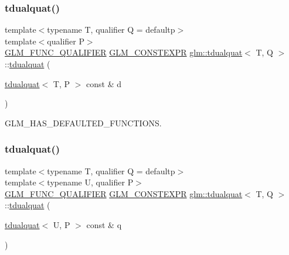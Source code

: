 \subsubsection{\texorpdfstring{tdualquat()}{tdualquat()}\hspace{0.1cm}{\footnotesize\ttfamily [10/11]}}
{\footnotesize\ttfamily template$<$typename T, qualifier Q = defaultp$>$ \\
template$<$qualifier P$>$ \\
\hyperlink{setup_8hpp_a33fdea6f91c5f834105f7415e2a64407}{G\+L\+M\+\_\+\+F\+U\+N\+C\+\_\+\+Q\+U\+A\+L\+I\+F\+I\+ER} \hyperlink{setup_8hpp_a08b807947b47031d3a511f03f89645ad}{G\+L\+M\+\_\+\+C\+O\+N\+S\+T\+E\+X\+PR} \hyperlink{structglm_1_1tdualquat}{glm\+::tdualquat}$<$ T, Q $>$\+::\hyperlink{structglm_1_1tdualquat}{tdualquat} (\begin{DoxyParamCaption}\item[{\hyperlink{structglm_1_1tdualquat}{tdualquat}$<$ T, P $>$ const \&}]{d }\end{DoxyParamCaption})}



G\+L\+M\+\_\+\+H\+A\+S\+\_\+\+D\+E\+F\+A\+U\+L\+T\+E\+D\+\_\+\+F\+U\+N\+C\+T\+I\+O\+NS. 

\mbox{\label{structglm_1_1tdualquat_a00f0899c1213aa991a65dfaf8d15fba5}} 
\subsubsection{\texorpdfstring{tdualquat()}{tdualquat()}\hspace{0.1cm}{\footnotesize\ttfamily [11/11]}}
{\footnotesize\ttfamily template$<$typename T, qualifier Q = defaultp$>$ \\
template$<$typename U, qualifier P$>$ \\
\hyperlink{setup_8hpp_a33fdea6f91c5f834105f7415e2a64407}{G\+L\+M\+\_\+\+F\+U\+N\+C\+\_\+\+Q\+U\+A\+L\+I\+F\+I\+ER} \hyperlink{setup_8hpp_a08b807947b47031d3a511f03f89645ad}{G\+L\+M\+\_\+\+C\+O\+N\+S\+T\+E\+X\+PR} \hyperlink{structglm_1_1tdualquat}{glm\+::tdualquat}$<$ T, Q $>$\+::\hyperlink{structglm_1_1tdualquat}{tdualquat} (\begin{DoxyParamCaption}\item[{\hyperlink{structglm_1_1tdualquat}{tdualquat}$<$ U, P $>$ const \&}]{q }\end{DoxyParamCaption})}



